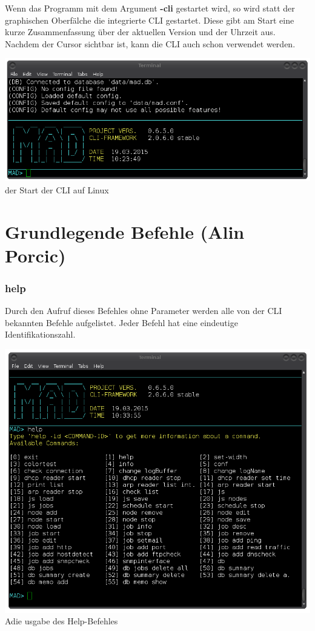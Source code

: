 \documentclass[12pt,a4paper]{report}
\begin{document}
\begin{onehalfspace}
Wenn das Programm mit dem Argument \textbf{-cli} gestartet wird, so wird statt der graphischen Oberfälche die integrierte CLI gestartet. Diese gibt am Start eine kurze Zusammenfassung über der aktuellen Version und der Uhrzeit aus. Nachdem der Cursor sichtbar ist, kann die CLI auch schon verwendet werden.

\begin{center}
\includegraphics[scale=0.5]{img/cli_mad.png}\\
der Start der CLI auf Linux
\end{center}

\section{Grundlegende Befehle (Alin Porcic)}

\subsubsection{help}

Durch den Aufruf dieses Befehles ohne Parameter werden alle von der CLI bekannten Befehle aufgelistet. Jeder Befehl hat eine eindeutige Identifikationszahl.\\

\begin{center}
\includegraphics[scale=0.5]{img/cli_help.png}\\
Adie usgabe des Help-Befehles
\end{center}


\end{onehalfspace}
\end{document}
